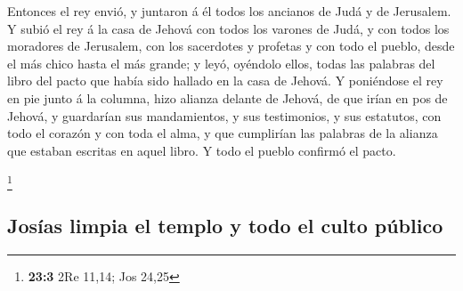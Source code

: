  Entonces el rey envió, y juntaron á él todos los ancianos
de Judá y de Jerusalem.  Y subió el rey á la casa de Jehová
con todos los varones de Judá, y con todos los moradores de Jerusalem,
con los sacerdotes y profetas y con todo el pueblo, desde el más chico
hasta el más grande; y leyó, oyéndolo ellos, todas las palabras del
libro del pacto que había sido hallado en la casa de Jehová.
 Y poniéndose el rey en pie junto á la columna, hizo alianza
delante de Jehová, de que irían en pos de Jehová, y guardarían sus
mandamientos, y sus testimonios, y sus estatutos, con todo el corazón y
con toda el alma, y que cumplirían las palabras de la alianza que
estaban escritas en aquel libro. Y todo el pueblo confirmó el pacto.

\footnote{\textbf{23:3} 2Re 11,14; Jos 24,25}

\hypertarget{josuxedas-limpia-el-templo-y-todo-el-culto-puxfablico}{%
\subsection{Josías limpia el templo y todo el culto
público}\label{josuxedas-limpia-el-templo-y-todo-el-culto-puxfablico}}

